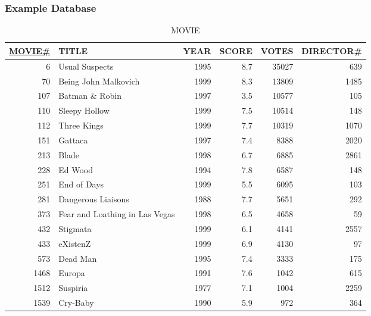 \documentclass[dvipsnames]{beamer}
\theoremstyle{plain}
\begin{document}
\begin{frame}
  \frametitle{Example Database}

  \begin{tiny}
  \begin{table}
    \caption{MOVIE}
    \begin{tabular}{|r|l|r|r|r|r|}\hline
\underline{MOVIE\#} & TITLE           & YEAR & SCORE & VOTES & DIRECTOR\#\\[2pt]\hline\hline
   6 & Usual Suspects                 & 1995 &   8.7 & 35027 &        639\\\hline
  70 & Being John Malkovich           & 1999 &   8.3 & 13809 &       1485\\\hline
 107 & Batman \& Robin                & 1997 &   3.5 & 10577 &        105\\\hline
 110 & Sleepy Hollow                  & 1999 &   7.5 & 10514 &        148\\\hline
 112 & Three Kings                    & 1999 &   7.7 & 10319 &       1070\\\hline
 151 & Gattaca                        & 1997 &   7.4 &  8388 &       2020\\\hline
 213 & Blade                          & 1998 &   6.7 &  6885 &       2861\\\hline
 228 & Ed Wood                        & 1994 &   7.8 &  6587 &        148\\\hline
 251 & End of Days                    & 1999 &   5.5 &  6095 &        103\\\hline
 281 & Dangerous Liaisons             & 1988 &   7.7 &  5651 &        292\\\hline
 373 & Fear and Loathing in Las Vegas & 1998 &   6.5 &  4658 &         59\\\hline
 432 & Stigmata                       & 1999 &   6.1 &  4141 &       2557\\\hline
 433 & eXistenZ                       & 1999 &   6.9 &  4130 &         97\\\hline
 573 & Dead Man                       & 1995 &   7.4 &  3333 &        175\\\hline
1468 & Europa                         & 1991 &   7.6 &  1042 &        615\\\hline
1512 & Suspiria                       & 1977 &   7.1 &  1004 &       2259\\\hline
1539 & Cry-Baby                       & 1990 &   5.9 &   972 &        364\\\hline
    \end{tabular}
  \end{table}
  \end{tiny}
\end{frame}
\end{document}
